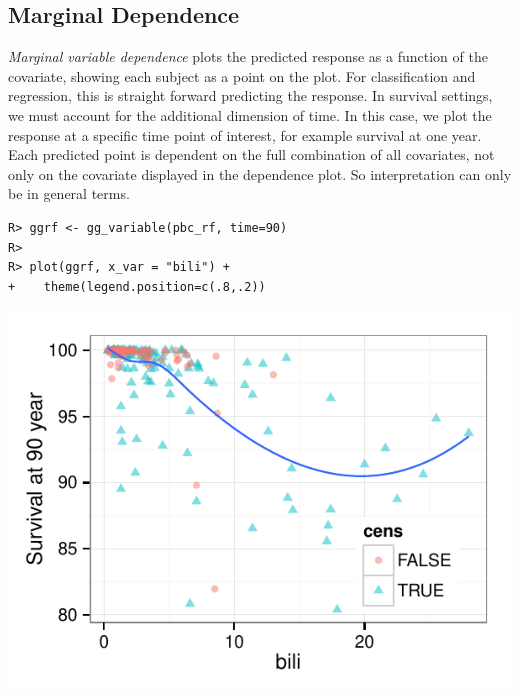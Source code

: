 \documentclass[nojss,letterpaper]{jss}\usepackage[]{graphicx}\usepackage[]{color}
\makeatletter
\def\maxwidth{ %
  \ifdim\Gin@nat@width>\linewidth
    \linewidth
  \else
    \Gin@nat@width
  \fi
}
\newenvironment{kframe}{%
 \def\at@end@of@kframe{}%
 \ifinner\ifhmode%
  \def\at@end@of@kframe{\end{minipage}}%
  \begin{minipage}{\columnwidth}%
 \fi\fi%
 \def\FrameCommand##1{\hskip\@totalleftmargin \hskip-\fboxsep
 \colorbox{shadecolor}{##1}\hskip-\fboxsep
     \hskip-\linewidth \hskip-\@totalleftmargin \hskip\columnwidth}%
 \MakeFramed {\advance\hsize-\width
   \@totalleftmargin\z@ \linewidth\hsize
   \@setminipage}}%
 {\par\unskip\endMakeFramed%
 \at@end@of@kframe}
\newenvironment{knitrout}{}{} %
\makeatother
\begin{document}
\subsection{Marginal Dependence}\label{S:variableDependence}
\emph{Marginal variable dependence} plots the predicted response as a function of the covariate, showing each subject as a point on the plot. For classification and regression, this is straight forward predicting the response. In survival settings, we must account for the additional dimension of time. In this case, we plot the response at a specific time point of interest, for example survival at one year. Each predicted point is dependent on the full combination of all covariates, not only on the covariate displayed in the dependence plot. So interpretation can only be in general terms.  
\begin{knitrout}\footnotesize
{}\color{fgcolor}\begin{kframe}
\begin{verbatim}
R> ggrf <- gg_variable(pbc_rf, time=90)
R> 
R> plot(ggrf, x_var = "bili") +
+    theme(legend.position=c(.8,.2))
\end{verbatim}
\end{kframe}

{\centering \includegraphics[width=\maxwidth]{figure/vig-variable-plot-1} 

}



\end{knitrout}
\end{document}
